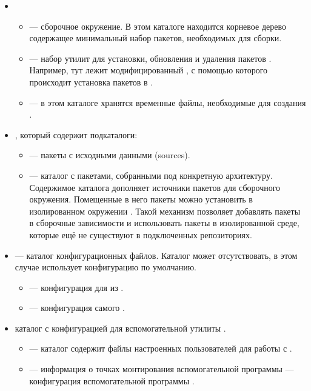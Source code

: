 \begin{itemize}
	\item {}
	\begin{itemize}[$\circ$]
		\item {} --- сборочное окружение. В этом каталоге находится
		корневое дерево содержащее минимальный набор пакетов, необходимых
		для сборки.
		\item {} --- набор утилит для установки, обновления и удаления
		пакетов . Например, тут лежит модифицированный ,
		с помощью которого происходит установка пакетов в .
		\item {} --- в этом каталоге хранятся временные файлы, необходимые для
		создания .
	\end{itemize}
	\item {}, который содержит подкаталоги:
	\begin{itemize}[$\circ$]
		\item {} --- пакеты с исходными данными (sources).
		\item {} --- каталог с пакетами, собранными
		под конкретную архитектуру.
		Содержимое каталога дополняет источники пакетов для сборочного окружения.
		Помещенные в него пакеты можно установить в изолированном окружении .
		Такой механизм позволяет добавлять пакеты в сборочные зависимости и использовать пакеты в
		изолированной среде, которые ещё не существуют в подключенных репозиториях.
	\end{itemize}
	\item {} --- каталог конфигурационных файлов. Каталог может отсутствовать,
	в этом случае  использует конфигурацию по умолчанию.
	\begin{itemize}[$\circ$]
		\item {} --- конфигурация для  из .
		\item {} --- конфигурация самого .
	\end{itemize}
	\item {} каталог с конфигурацией для вспомогательной утилиты .
	\begin{itemize}[$\circ$]
		\item {} --- каталог содержит файлы настроенных пользователей для работы с .
		\item \hypertarget{mount_fs_hasher}{} --- информация о точках монтирования вспомогательной программы 
		 --- конфигурация вспомогательной программы .
	\end{itemize}
\end{itemize}

